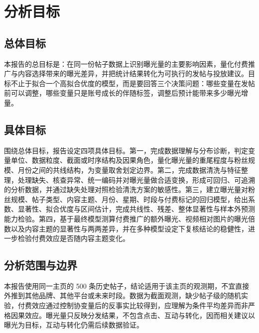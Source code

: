 \section{分析目标}
\subsection{总体目标}

本报告的总目标是：在同一份帖子数据上识别曝光量的主要影响因素，量化付费推广与内容选择带来的曝光差异，并把统计结果转化为可执行的发帖与投放建议。目标不止于拟合一个高拟合优度的模型，而是要回答三个决策问题：哪些变量在发帖前可以调整，哪些变量只是账号成长的伴随标签，调整后预计能带来多少曝光增量。

\subsection{具体目标}

围绕总体目标，报告设定四项具体目标。第一，完成数据理解与分布诊断，判定变量单位、数据粒度、截面或时序结构及因果角色，量化曝光量的重尾程度与粉丝规模、月份之间的共线结构，为变量取舍划定边界。第二，完成数据清洗与特征整理，处理缺失、核查异常、统一编码并对曝光量做合适变换，形成可回归、可追溯的分析数据，并通过缺失处理对照检验清洗方案的敏感性。第三，建立曝光量对粉丝规模、帖子类型、内容主题、月份、星期、时段与付费标记的回归模型，给出系数、显著性、拟合优度与区间估计，完成共线性、残差、整体显著性与样本外预测能力检验。第四，基于最终模型测算付费推广的额外曝光、视频相对图片的曝光倍数以及内容主题的显著性与两两差异，并在多种模型设定下复核结论的稳健性，进一步检验付费效应是否随内容主题变化。

\subsection{分析范围与边界}

本报告使用同一主页的 500 条历史帖子，结论适用于该主页的观测期，不宜直接外推到其他品牌、其他平台或未来时段。数据为截面观测，缺少帖子级的随机实验，付费效应通过控制协变量后的反事实比较得到，应理解为条件平均差异而非严格因果效应。曝光量只反映分发结果，不包含点击、互动与转化，因而相关建议以曝光为目标，互动与转化仍需后续数据验证。
